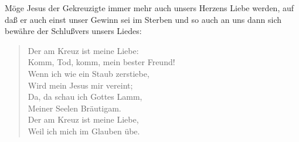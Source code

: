 Möge Jesus der Gekreuzigte immer mehr auch unsers Herzens Liebe werden, auf daß er auch einst unser Gewinn sei im Sterben und so auch an uns dann sich bewähre der Schlußvers unsers Liedes:

\begin{verse}
Der am Kreuz ist meine Liebe:\\
Komm, Tod, komm, mein bester Freund!\\
Wenn ich wie ein Staub zerstiebe,\\
Wird mein Jesus mir vereint;\\
Da, da schau ich Gottes Lamm,\\
Meiner Seelen Bräutigam.\\
Der am Kreuz ist meine Liebe,\\
Weil ich mich im Glauben übe.
\end{verse}
